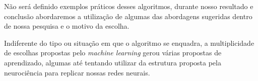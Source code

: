 Não será definido exemplos práticos desses algoritmos, durante nosso resultado e conclusão abordaremos a utilização de algumas das abordagens sugeridas dentro de nossa pesquisa e o motivo da escolha.

Indiferente do tipo ou situação em que o algoritmo se enquadra, a multiplicidade de escolhas propostas pelo \textit{machine learning} gerou várias propostas de aprendizado, algumas até tentando utilizar da estrutura proposta pela neurociência para replicar nossas redes neurais.
